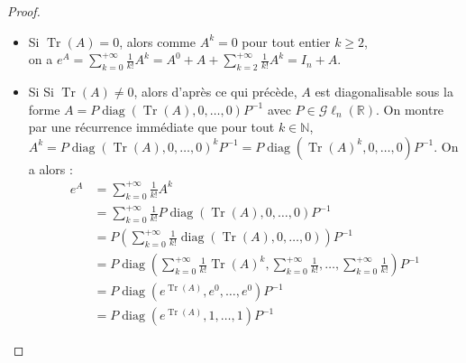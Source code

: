 \documentclass[a4paper]{article}
\begin{document}
\begin{proof}
    \begin{itemize}
        \item Si $\operatorname{Tr}(A) = 0$, alors comme $A^k = 0$ pour tout entier $k \geq 2$,\\ on a $\displaystyle e^A = \sum_{k=0}^{+\infty} \frac{1}{k!}A^k = A^0 + A + \sum_{k=2}^{+\infty} \frac{1}{k!}A^k = I_n + A$.
        \item Si Si $\operatorname{Tr}(A) \neq 0$, alors d'après ce qui précède, $A$ est diagonalisable sous la forme $A = P \operatorname{diag}(\operatorname{Tr}(A), 0, \dots, 0)P^{-1}$ avec $P \in \mathcal{G}\ell_n(\mathbb{R})$. On montre par une récurrence immédiate que pour tout $k \in \mathbb{N}$,\\ $A^k =  P \operatorname{diag}(\operatorname{Tr}(A), 0, \dots, 0)^kP^{-1} =  P \operatorname{diag}\left(\operatorname{Tr}(A)^k, 0, \dots, 0\right)P^{-1}$. On a alors :
        \begin{align*}
            e^A &= \sum_{k=0}^{+\infty} \frac{1}{k!}A^k\\
            &= \sum_{k=0}^{+\infty}  \frac{1}{k!} P \operatorname{diag}(\operatorname{Tr}(A), 0, \dots, 0)P^{-1}\\
            &= P \left(\sum_{k=0}^{+\infty}  \frac{1}{k!} \operatorname{diag}(\operatorname{Tr}(A), 0, \dots, 0)\right) P^{-1}\\
            &= P \operatorname{diag}\left(\sum_{k=0}^{+\infty}  \frac{1}{k!} \operatorname{Tr}(A)^k, \sum_{k=0}^{+\infty}  \frac{1}{k!}, \dots, \sum_{k=0}^{+\infty}  \frac{1}{k!}\right) P^{-1}\\
            &= P \operatorname{diag}\left(e^{\operatorname{Tr}(A)}, e^0, \dots, e^0\right) P^{-1}\\
            &= P\operatorname{diag}\left(e^{\operatorname{Tr}(A)}, 1, \dots, 1\right)P^{-1}
        \end{align*}
    \end{itemize}
\end{proof}
\end{document}
